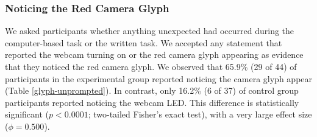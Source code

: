 \documentclass{sigchi}
\begin{document}






%

\subsubsection{Noticing the Red Camera Glyph}

We asked participants whether anything unexpected had occurred during the computer-based task or the written task.  We accepted any statement that reported the webcam turning on or the red camera glyph appearing as evidence that they noticed the red camera glyph. We observed that 65.9\% (29 of 44) of participants in the experimental group reported noticing the camera glyph appear (Table \ref{glyph-unprompted}). In contrast, only 16.2\% (6 of 37) of control group participants reported noticing the webcam LED.  This difference is statistically significant ($p<0.0001$; two-tailed Fisher's exact test), with a very large effect size ($\phi=0.500$).
\end{document}
